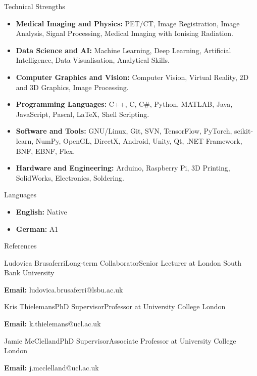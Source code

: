 \documentclass{cv}
\begin{document}
    \begin{rSection}{Technical Strengths}
        \item \begin{itemize}
            \item \textbf{Medical Imaging and Physics:} PET/CT, Image Registration, Image Analysis, Signal Processing, Medical Imaging with Ionising Radiation.
            \item \textbf{Data Science and AI:} Machine Learning, Deep Learning, Artificial Intelligence, Data Visualisation, Analytical Skills.
            \item \textbf{Computer Graphics and Vision:} Computer Vision, Virtual Reality, 2D and 3D Graphics, Image Processing.
            \item \textbf{Programming Languages:} C++, C, C\#, Python, MATLAB, Java, JavaScript, Pascal, LaTeX, Shell Scripting.
            \item \textbf{Software and Tools:} GNU/Linux, Git, SVN, TensorFlow, PyTorch, scikit-learn, NumPy, OpenGL, DirectX, Android, Unity, Qt, .NET Framework, BNF, EBNF, Flex.
            \item \textbf{Hardware and Engineering:} Arduino, Raspberry Pi, 3D Printing, SolidWorks, Electronics, Soldering.
        \end{itemize}
    \end{rSection}
    
    \begin{rSection}{Languages}
        \item \begin{itemize}
            \item \textbf{English:} Native
            \item \textbf{German:} A1
        \end{itemize} 
    \end{rSection}

    \begin{rSection}{References}
        \item \begin{rSubsection}{Ludovica Brusaferri}{Long-term Collaborator}{Senior Lecturer at London South Bank University}{}
            \item \textbf{Email:} ludovica.brusaferri@lsbu.ac.uk
        \end{rSubsection}
        
        \item \begin{rSubsection}{Kris Thielemans}{PhD Supervisor}{Professor at University College London}{}
            \item \textbf{Email:} k.thielemans@ucl.ac.uk
        \end{rSubsection}

        \item \begin{rSubsection}{Jamie McClelland}{PhD Supervisor}{Associate Professor at University College London}{}
            \item \textbf{Email:} j.mcclelland@ucl.ac.uk
        \end{rSubsection}
    \end{rSection}
    
\end{document}

